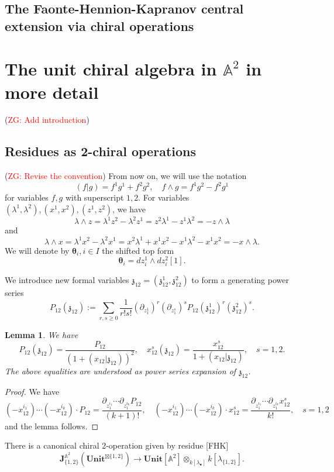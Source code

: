\documentclass[11pt]{amsart}
\newtheorem{lem}[thm]{Lemma}
\theoremstyle{definition}
\theoremstyle{remark}
\numberwithin{equation}{section}
\newcommand{\Gui}[1]{(\textcolor{red}{ZG: #1})}
\begin{document}
\subsection{The Faonte-Hennion-Kapranov central extension via chiral operations}


\section{The unit chiral algebra in $\mathbb{A}^2$ in more detail}
\Gui{Add introduction}
\subsection{Residues as 2-chiral operations}
\Gui{Revise the convention}
From now on, we will use the notation
$$
(f|g)=f^1g^1+f^2g^2,\quad f\wedge g=f^1g^2-f^2g^1
$$
for variables $f,g$ with superscript $1,2$. For variables $(\lambda^1,\lambda^2), (x^1,x^2), (z^1,z^2)$, we have
$$
\lambda\wedge z=\lambda^1z^2-\lambda^2z^1=z^2\lambda^1-z^1\lambda^2=-z\wedge\lambda
$$
and
$$
\lambda\wedge x=\lambda^1x^2-\lambda^2x^1=x^2\lambda^1+x^1x^2-x^1\lambda^2-x^1x^2=-x\wedge\lambda.
$$
We will denote by $\boldsymbol{\theta}_i,i\in  I$ the shifted top form
$$
\boldsymbol{\theta}_i=dz_i^1\wedge dz^2_i[1].
$$

We introduce new formal variables $\mathfrak{z}_{12}=(\mathfrak{z}_{12}^1,\mathfrak{z}^2_{12})$ to form a generating power series
$$
P_{12}(\mathfrak{z}_{12}):=\sum_{r,s\geq 0}\frac{1}{r!s!}(\partial_{z^1_1})^r(\partial_{z^s_1})^sP_{12}(\mathfrak{z}^1_{12})^r(\mathfrak{z}^2_{12})^s.
$$

\begin{lem}
  We have
  $$
  P_{12}(\mathfrak{z}_{12})=\frac{P_{12}}{\left(1+(x_{12}|\mathfrak{z}_{12})\right)^2},\quad x^s_{12}(\mathfrak{z}_{12})=\frac{x^s_{12}}{1+(x_{12}|\mathfrak{z}_{12})},\quad s=1,2.
  $$
  The above equalities are understood as power series expansion of $\mathfrak{z}_{12}$.
\end{lem}

\begin{proof}
  We have
  $$
  (-x^{i_1}_{12})\cdots (-x^{i_k}_{12})\cdot P_{12}=\frac{\partial_{z^{i_1}_1}\cdots \partial_{z^{i_k}_1}P_{12}}{  (k+1)!},\quad   (-x^{i_1}_{12})\cdots (-x^{i_k}_{12})\cdot x^s_{12}=\frac{\partial_{z^{i_1}_1}\cdots \partial_{z^{i_k}_1}x^s_{12}}{  k!},\quad s=1,2
  $$
  and the lemma follows.
\end{proof}

There is a canonical chiral 2-operation  given by residue [FHK]
$$
\mathbf{J}^{\mathbb{A}^2}_{\{1,2\}}(\mathbf{Unit}^{\boxtimes\{1,2\} })\rightarrow \mathbf{Unit}[\mathbb{A}^2]\otimes_{k[\lambda_{\bullet}]}k[\lambda_{\{1,2\}}].
$$
\end{document}
